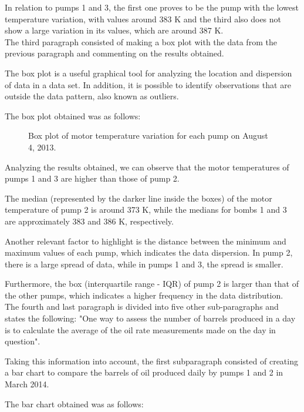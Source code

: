 \documentclass[conference]{IEEEtran}
\begin{document}
In relation to pumps 1 and 3, the first one proves to be the pump with the lowest temperature variation, with values around 383 K and the third also does not show a large variation in its values, which are around 387 K.\\

The third paragraph consisted of making a box plot with the data from the previous paragraph and commenting on the results obtained.

The box plot is a useful graphical tool for analyzing the location and dispersion of data in a data set. In addition, it is possible to identify observations that are outside the data pattern, also known as outliers.

The box plot obtained was as follows:

\begin{figure}[H]
    \caption{Box plot of motor temperature variation for each pump on August 4, 2013.}
    \label{pump_boxplot_motorTemperature}
\end{figure}

Analyzing the results obtained, we can observe that the motor temperatures of pumps 1 and 3 are higher than those of pump 2. 

The median (represented by the darker line inside the boxes) of the motor temperature of pump 2 is around 373 K, while the medians for bombs 1 and 3 are approximately 383 and 386 K, respectively.

Another relevant factor to highlight is the distance between the minimum and maximum values of each pump, which indicates the data dispersion. In pump 2, there is a large spread of data, while in pumps 1 and 3, the spread is smaller.

Furthermore, the box (interquartile range - IQR) of pump 2 is larger than that of the other pumps, which indicates a higher frequency in the data distribution.\\

The fourth and last paragraph is divided into five other sub-paragraphs and states the following: "One way to assess the number of barrels produced in a day is to calculate the average of the oil rate measurements made on the day in question".

Taking this information into account, the first subparagraph consisted of creating a bar chart to compare the barrels of oil produced daily by pumps 1 and 2 in March 2014.

The bar chart obtained was as follows:
\end{document}

